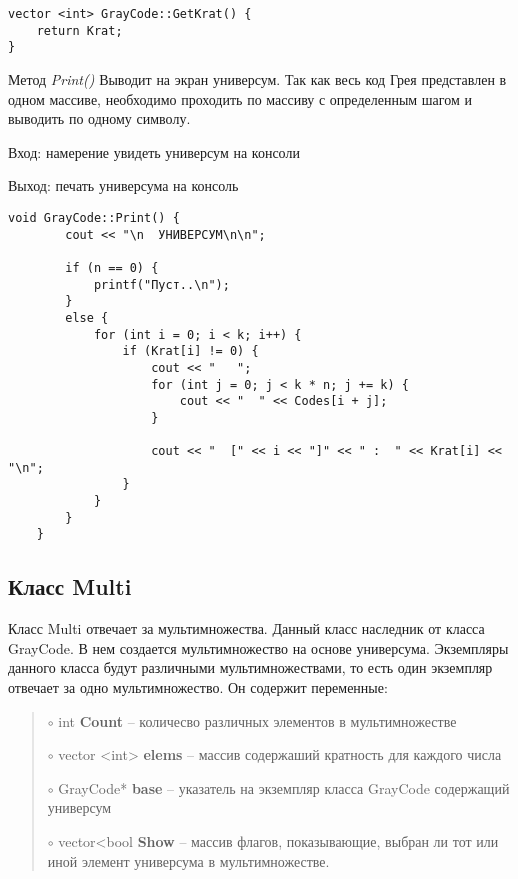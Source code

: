 \documentclass[10pt,a4paper,final]{article} %
\begin{document}
\begin{lstlisting}[caption={Метод GetKrat}]
vector <int> GrayCode::GetKrat() {
	return Krat;
}
\end{lstlisting}



\par Метод \textit{ Print()} Выводит на экран универсум. Так как весь код Грея представлен в одном массиве, необходимо проходить по массиву с определенным шагом и выводить по одному символу.
\par Вход: намерение увидеть универсум на консоли 
\par Выход: печать универсума на консоль 

\begin{lstlisting}[caption={Метод Print}]
	void GrayCode::Print() {
		cout << "\n  УНИВЕРСУМ\n\n";
		
		if (n == 0) {
			printf("Пуст..\n");
		}
		else {
			for (int i = 0; i < k; i++) {
				if (Krat[i] != 0) {
					cout << "   ";
					for (int j = 0; j < k * n; j += k) {
						cout << "  " << Codes[i + j];
					}
					
					cout << "  [" << i << "]" << " :  " << Krat[i] << "\n";
				}
			}
		}
	}
\end{lstlisting}


\newpage
\subsection {Класс Multi}

\par Класс Multi отвечает за мультимножества. Данный класс наследник от класса GrayCode. В нем создается мультимножество на основе универсума. Экземпляры данного класса будут различными мультимножествами, то есть один экземпляр отвечает за одно мультимножество. Он содержит переменные:
\begin{quote}
	
	$\circ$ int \textbf{Count} -- количесво различных элементов в мультимножестве
	
	$\circ$ vector <int> \textbf{elems} -- массив содержаший кратность для каждого числа 
	
	$\circ$ GrayCode* \textbf{base} -- указатель на экземпляр класса GrayCode содержащий универсум
	
	$\circ$ vector<bool \textbf{Show} -- массив флагов, показывающие, выбран ли тот или иной элемент универсума в мультимножестве.
	
\end{quote}
\end{document}
